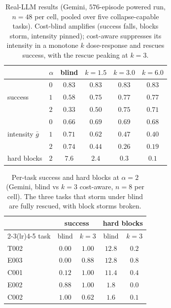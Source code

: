\documentclass[11pt]{article}
\newcommand{\poweredEpisodes}{576}
\begin{document}
\begin{table}[t]
\centering
\caption{Real-LLM results (Gemini, $\poweredEpisodes$-episode powered run,
$n=48$ per cell, pooled over five collapse-capable tasks). Cost-blind amplifies
(success falls, blocks storm, intensity pinned); cost-aware suppresses its
intensity in a monotone $k$ dose-response and rescues success, with the rescue
peaking at $k{=}3$.}
\label{tab:gemini}
\begin{tabular}{llcccc}
\toprule
 & $\alpha$ & blind & $k{=}1.5$ & $k{=}3.0$ & $k{=}6.0$ \\
\midrule
\multirow{3}{*}{success}
 & $0$ & $0.83$ & $0.83$ & $0.83$ & $0.83$ \\
 & $1$ & $0.58$ & $0.75$ & $0.77$ & $0.77$ \\
 & $2$ & $0.33$ & $0.50$ & $\mathbf{0.75}$ & $0.71$ \\
\midrule
\multirow{3}{*}{intensity $\bar g$}
 & $0$ & $0.66$ & $0.69$ & $0.69$ & $0.68$ \\
 & $1$ & $0.71$ & $0.62$ & $0.47$ & $0.40$ \\
 & $2$ & $0.74$ & $0.44$ & $0.26$ & $0.19$ \\
\midrule
hard blocks & $2$ & $7.6$ & $2.4$ & $0.3$ & $0.1$ \\
\bottomrule
\end{tabular}
\end{table}

\begin{table}[t]
\centering
\caption{Per-task success and hard blocks at $\alpha=2$ (Gemini, blind vs
$k{=}3$ cost-aware, $n=8$ per cell). The three tasks that storm under blind are
fully rescued, with block storms broken.}
\label{tab:gemini-tasks}
\begin{tabular}{lcccc}
\toprule
 & \multicolumn{2}{c}{success} & \multicolumn{2}{c}{hard blocks} \\
\cmidrule(lr){2-3}\cmidrule(lr){4-5}
task & blind & $k{=}3$ & blind & $k{=}3$ \\
\midrule
T002 & $0.00$ & $\mathbf{1.00}$ & $12.8$ & $0.2$ \\
E003 & $0.00$ & $\mathbf{0.88}$ & $12.8$ & $0.8$ \\
C001 & $0.12$ & $\mathbf{1.00}$ & $11.4$ & $0.4$ \\
E002 & $0.88$ & $1.00$ & $1.8$ & $0.0$ \\
C002 & $1.00$ & $0.62$ & $1.6$ & $0.1$ \\
\bottomrule
\end{tabular}
\end{table}
\end{document}
